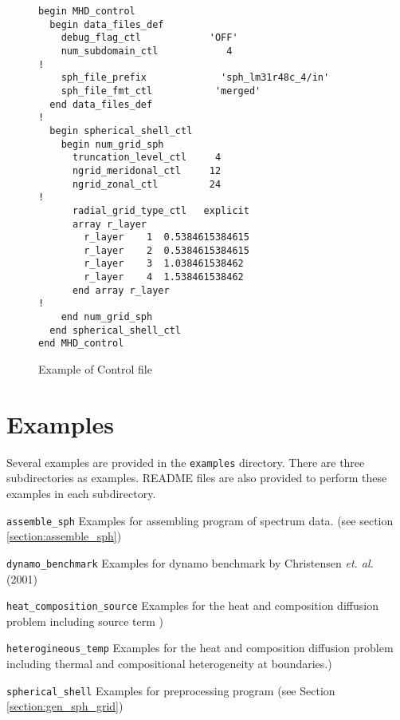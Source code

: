 \begin{figure}[htbp]
\begin{center}
%
\begin{verbatim}
begin MHD_control
  begin data_files_def
    debug_flag_ctl            'OFF'
    num_subdomain_ctl            4
!
    sph_file_prefix             'sph_lm31r48c_4/in'
    sph_file_fmt_ctl           'merged'
  end data_files_def
!
  begin spherical_shell_ctl
    begin num_grid_sph
      truncation_level_ctl     4
      ngrid_meridonal_ctl     12
      ngrid_zonal_ctl         24
!
      radial_grid_type_ctl   explicit
      array r_layer
        r_layer    1  0.5384615384615
        r_layer    2  0.5384615384615
        r_layer    3  1.038461538462
        r_layer    4  1.538461538462
      end array r_layer
!
    end num_grid_sph
  end spherical_shell_ctl
end MHD_control
\end{verbatim}
%
\caption{Example of Control file}
\label{fig:control_example}
\end{center}
\end{figure}
%

\newpage
\section{Examples} \label{section:examples}
Several examples are provided in the \verb|examples| directory. There are three subdirectories as examples. README files are also provided to perform these examples in each subdirectory.
%
\begin{description}
\item{\tt assemble\_sph}    Examples for assembling program of spectrum data. (see section \ref{section:assemble_sph})
\item{\tt dynamo\_benchmark} Examples for dynamo benchmark by Christensen {\it et. al.} (2001)
\item{\tt heat\_composition\_source} Examples for the heat and composition diffusion problem including source term )
\item{\tt heterogineous\_temp} Examples for the heat and composition diffusion problem including thermal and compositional heterogeneity at boundaries.)
\item{\tt spherical\_shell} Examples for preprocessing program (see Section \ref{section:gen_sph_grid})
\end{description}
%

